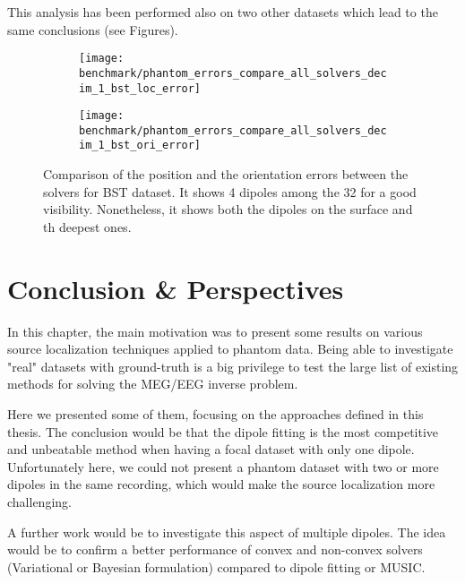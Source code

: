 This analysis has been performed also on two other datasets which lead to the same conclusions (see Figures).

\begin{figure}[p]
	\centering
    \begin{subfigure}{0.9\linewidth}
		\centering
		\texttt{[image: benchmark/phantom\_errors\_compare\_all\_solvers\_decim\_1\_bst\_loc\_error]}
	    \caption{\label{fig:phantom_errors_compare_all_solvers_decim_1_bst_loc_error}}
    \end{subfigure}
	\hspace{5cm}
	\hfill
    \begin{subfigure}{0.9\linewidth}  
		\centering 
		\texttt{[image: benchmark/phantom\_errors\_compare\_all\_solvers\_decim\_1\_bst\_ori\_error]}
		\caption{\label{fig:phantom_errors_compare_all_solvers_decim_1_bst_ori_error}}
	\end{subfigure}

		\caption{Comparison of the position and the orientation errors between the solvers for BST dataset. It shows 4 dipoles among the 32 for a good visibility. Nonetheless, it shows both the dipoles on the surface and th deepest ones.\label{phantom_errors_compare_all_solvers_decim_1_bst_loc_error}}
\end{figure}

\section{Conclusion \& Perspectives}
In this chapter, the main motivation was to present some results on various source localization techniques applied to phantom data. Being able to investigate "real" datasets with ground-truth is a big privilege to test the large list of existing methods for solving the MEG/EEG inverse problem.

Here we presented some of them, focusing on the approaches defined in this thesis. The conclusion would be that the dipole fitting is the most competitive and unbeatable method when having a focal dataset with only one dipole. Unfortunately here, we could not present a phantom dataset with two or more dipoles in the same recording, which would make the source localization more challenging.

A further work would be to investigate this aspect of multiple dipoles. The idea would be to confirm a better performance of convex and non-convex solvers (Variational or Bayesian formulation) compared to dipole fitting or MUSIC.

